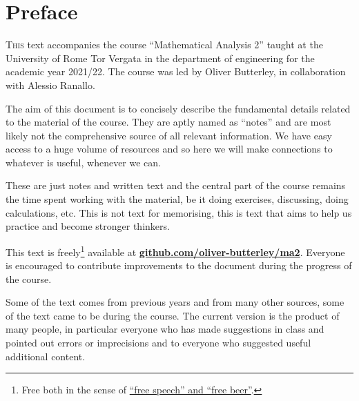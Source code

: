 \chapter{Preface}
\lettrine{T}{his} text accompanies the course ``Mathematical Analysis 2'' taught at the University of Rome Tor Vergata in the department of engineering for the academic year 2021/22.
The course was led by Oliver Butterley, in collaboration with Alessio Ranallo. 

The aim of this document is to concisely describe the fundamental details related to the material of the course.
They are aptly named as ``notes'' and are most likely not the comprehensive source of all relevant information.
We have easy access to a huge volume of resources and so here we will make connections to whatever is useful, whenever we can. 

These are just notes and written text and the central part of the course remains the time spent working with the material, be it doing exercises, discussing, doing calculations, etc. This is not text for memorising, this is text that aims to help us practice and become stronger thinkers.

This text is freely\footnote{Free both in the sense of \href{https://en.wikipedia.org/wiki/Gratis_versus_libre}{``free speech'' and ``free beer''}.} available at \href{https://github.com/oliver-butterley/ma2}{\textbf{github.com/oliver-butterley/ma2}}.
Everyone is encouraged to contribute improvements to the document during the progress of the course. 

Some of the text comes from previous years and from many other sources, some of the text came to be during the course.
The current version is the product of many people, in particular everyone who has made suggestions in class and pointed out errors or imprecisions and to everyone who suggested useful additional content.


